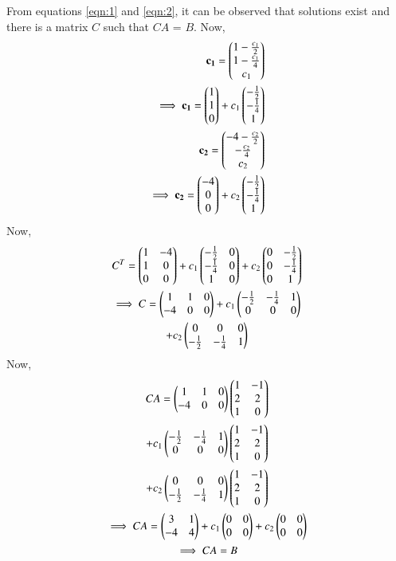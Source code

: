 \documentclass[journal,12pt,twocolumn]{IEEEtran}
\begin{document}
From equations \ref{eqn:1} and \ref{eqn:2}, it can be observed that solutions exist and there is a matrix $C$ such that $CA$ = $B$.
Now,
\begin{align}
\mathbf{c_1} = \begin{pmatrix}1- \frac{c_1}{2}\\1-\frac{c_1}{4}\\c_1\end{pmatrix}\\
\implies \mathbf{c_1} = \begin{pmatrix}1\\1\\0\end{pmatrix} + c_1\begin{pmatrix}-\frac{1}{2}\\-\frac{1}{4}\\1\end{pmatrix}\\
\mathbf{c_2} = \begin{pmatrix}-4- \frac{c_2}{2}\\-\frac{c_2}{4}\\c_2\end{pmatrix}\\
\implies \mathbf{c_2} = \begin{pmatrix}-4\\0\\0\end{pmatrix} + c_2\begin{pmatrix}-\frac{1}{2}\\-\frac{1}{4}\\1\end{pmatrix}
\end{align}
Now,
\begin{multline}
C^T = \begin{pmatrix}1 & -4\\1 & 0\\0 & 0\end{pmatrix}+c_1\begin{pmatrix}-\frac{1}{2} & 0\\-\frac{1}{4} & 0\\1 & 0\end{pmatrix} + c_2\begin{pmatrix}0 & -\frac{1}{2}\\0 & -\frac{1}{4}\\0 & 1\end{pmatrix}\\
\implies C = \begin{pmatrix}1 & 1 & 0\\-4 & 0& 0\end{pmatrix} + c_1 \begin{pmatrix}-\frac{1}{2} & -\frac{1}{4} & 1\\0 & 0 &0\end{pmatrix}\\
+c_2\begin{pmatrix}0 & 0 &0\\-\frac{1}{2} & -\frac{1}{4} & 1\end{pmatrix}
\end{multline}
Now,
\begin{multline}
CA = \begin{pmatrix}1 & 1 & 0\\-4 & 0& 0\end{pmatrix}\begin{pmatrix}1 & -1\\2 & 2\\1 & 0\end{pmatrix}\\
+ c_1 \begin{pmatrix}-\frac{1}{2} & -\frac{1}{4} & 1\\0 & 0 &0\end{pmatrix}\begin{pmatrix}1 & -1\\2 & 2\\1 & 0\end{pmatrix}\\+c_2\begin{pmatrix}0 & 0 &0\\-\frac{1}{2} & -\frac{1}{4} & 1\end{pmatrix}\begin{pmatrix}1 & -1\\2 & 2\\1 & 0\end{pmatrix}\\
\implies CA = \begin{pmatrix}3 & 1\\-4 & 4\end{pmatrix}+c_1\begin{pmatrix}0 & 0\\0 & 0\end{pmatrix}+c_2\begin{pmatrix}0 & 0\\0 & 0\end{pmatrix}\\
\implies CA = B
\end{multline}
\end{document}
